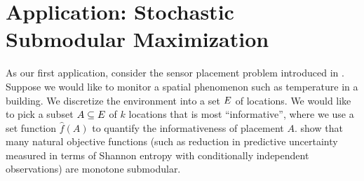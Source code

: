 %
\section{Application: Stochastic Submodular Maximization} 
\label{sec:stochastic-maximization}
%

As our first application, consider the sensor placement problem
introduced in .  Suppose we would like to monitor a
spatial phenomenon such as temperature in a building.  We discretize
the environment into a set $E$ of locations.  We would like
to pick a subset $A\subseteq E$ of $k$ locations that is most
``informative'', where we use a set function $\hat{f}(A)$ 
to quantify the informativeness of placement $A$. \citet{krause07nearoptimal} show that many natural objective functions (such as reduction in predictive uncertainty measured in terms of Shannon entropy with conditionally independent observations) are monotone submodular. 

